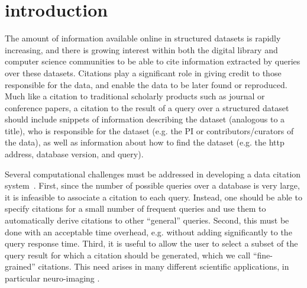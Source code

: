 \section{introduction}\label{Sec: intro}

The amount of information available online in structured datasets is rapidly increasing, and there is growing interest within both the digital library and computer science communities to be able to cite information extracted by queries over these datasets. Citations play a significant role in giving credit to those responsible for the data, and enable the data to be later found or reproduced. Much like a citation to traditional scholarly products such as journal or conference papers, a citation to the result of a query over a structured dataset should include snippets of information describing the dataset (analogous to a title), who is responsible for the dataset (e.g. the PI or contributors/curators of the data), as well as information about how to find the dataset (e.g. the http address, database version, and query). 

Several computational challenges must be addressed in developing a data citation system~\cite{BunemanEtAl2016}.  First, since the number of possible queries over a database is very large, it is infeasible to associate a citation to each query.  Instead, one should be able to specify citations for a small number of frequent queries and use them to automatically derive citations to other ``general'' queries.  Second, this  must be done with an acceptable time overhead, e.g. without adding significantly to the query response time.  Third, it is useful to allow the user to select a subset of the query result for which a citation should be generated, which we call  ``fine-grained'' citations.  This need  arises in many different scientific applications, in particular neuro-imaging \cite{HonorEtAl2016}. 



